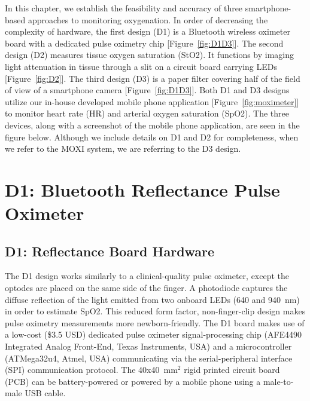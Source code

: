 In this chapter, we establish the feasibility and accuracy of three smartphone-based approaches to monitoring oxygenation. In order of decreasing the complexity of hardware, the first design (D1) is a Bluetooth wireless oximeter board with a dedicated pulse oximetry chip [Figure~\ref{fig:D1D3}]. The second design (D2) measures tissue oxygen saturation (StO2). It functions by imaging light attenuation in tissue through a slit on a circuit board carrying LEDs [Figure~\ref{fig:D2}]. The third design (D3) is a paper filter covering half of the field of view of a smartphone camera [Figure~\ref{fig:D1D3}]. Both D1 and D3 designs utilize our in-house developed mobile phone application [Figure~\ref{fig:moximeter}] to monitor heart rate (HR) and arterial oxygen saturation (SpO2). The three devices, along with a screenshot of the mobile phone application, are seen in the figure below. Although we include details on D1 and D2 for completeness, when we refer to the \ac{MOXI} system, we are referring to the D3 design. 



\section{D1: Bluetooth Reflectance Pulse Oximeter}
\subsection{D1: Reflectance Board Hardware}
The D1 design works similarly to a clinical-quality pulse oximeter, except the optodes are placed on the same side of the finger. A photodiode captures the diffuse reflection of the light emitted from two onboard LEDs (640 and 940~nm) in order to estimate SpO2. This reduced form factor, non-finger-clip design makes pulse oximetry measurements more newborn-friendly. The D1 board makes use of a low-cost (\$3.5 USD) dedicated pulse oximeter signal-processing chip (AFE4490 Integrated Analog Front-End, Texas Instruments, USA) and a microcontroller (ATMega32u4, Atmel, USA) communicating via the serial-peripheral interface (SPI) communication protocol. The 40x40~mm$^2$ rigid printed circuit board (PCB) can be battery-powered or powered by a mobile phone using a male-to-male USB cable. 
    
